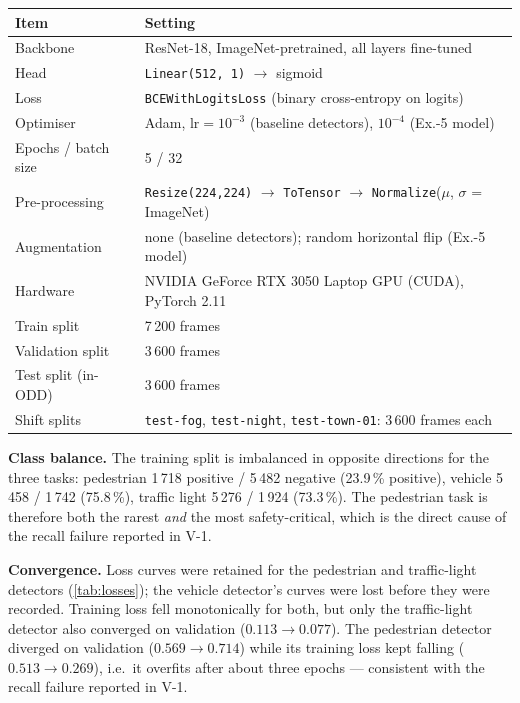 \documentclass[a4paper,12pt]{article}
\begin{document}
\begin{center}
\small
\begin{tabular}{@{}ll@{}}
\toprule
\textbf{Item} & \textbf{Setting} \\
\midrule
Backbone            & ResNet-18, ImageNet-pretrained, all layers fine-tuned \\
Head                & \texttt{Linear(512, 1)} $\rightarrow$ sigmoid \\
Loss                & \texttt{BCEWithLogitsLoss} (binary cross-entropy on logits) \\
Optimiser           & Adam, $\text{lr}=10^{-3}$ (baseline detectors), $10^{-4}$ (Ex.-5 model) \\
Epochs / batch size & 5 / 32 \\
Pre-processing      & \texttt{Resize(224,224)} $\rightarrow$ \texttt{ToTensor} $\rightarrow$
                      \texttt{Normalize}($\mu$, $\sigma$ = ImageNet) \\
Augmentation        & none (baseline detectors); random horizontal flip (Ex.-5 model) \\
Hardware            & NVIDIA GeForce RTX 3050 Laptop GPU (CUDA), PyTorch 2.11 \\
\midrule
Train split         & 7\,200 frames \\
Validation split    & 3\,600 frames \\
Test split (in-ODD) & 3\,600 frames \\
Shift splits        & \texttt{test-fog}, \texttt{test-night}, \texttt{test-town-01}: 3\,600 frames each \\
\bottomrule
\end{tabular}
\end{center}

\noindent\textbf{Class balance.} The training split is imbalanced in opposite directions
for the three tasks: pedestrian 1\,718 positive / 5\,482 negative (23.9\,\% positive),
vehicle 5\,458 / 1\,742 (75.8\,\%), traffic light 5\,276 / 1\,924 (73.3\,\%). The
pedestrian task is therefore both the rarest \emph{and} the most safety-critical, which is
the direct cause of the recall failure reported in V-1.

\noindent\textbf{Convergence.} Loss curves were retained for the pedestrian and
traffic-light detectors (\cref{tab:losses}); the vehicle detector's curves were lost
before they were recorded. Training loss fell monotonically for both, but only the
traffic-light detector also converged on validation ($0.113 \rightarrow 0.077$). The
pedestrian detector diverged on validation ($0.569 \rightarrow 0.714$) while its training
loss kept falling ($0.513 \rightarrow 0.269$), i.e.\ it overfits after about three epochs
--- consistent with the recall failure reported in V-1.
\end{document}
